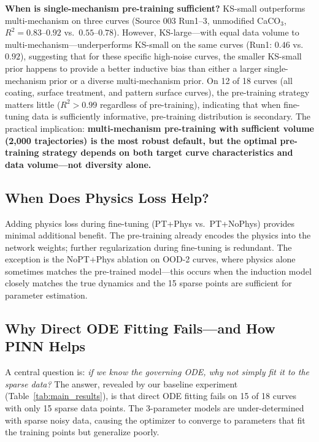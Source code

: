 \documentclass[review]{elsarticle}
\begin{document}
\textbf{When is single-mechanism pre-training sufficient?} KS-small outperforms multi-mechanism on three curves (Source 003 Run1--3, unmodified CaCO$_3$, $R^2 = 0.83$--$0.92$ vs.\ $0.55$--$0.78$). However, KS-large---with equal data volume to multi-mechanism---underperforms KS-small on the same curves (Run1: $0.46$ vs.\ $0.92$), suggesting that for these specific high-noise curves, the smaller KS-small prior happens to provide a better inductive bias than either a larger single-mechanism prior or a diverse multi-mechanism prior. On 12 of 18 curves (all coating, surface treatment, and pattern surface curves), the pre-training strategy matters little ($R^2 > 0.99$ regardless of pre-training), indicating that when fine-tuning data is sufficiently informative, pre-training distribution is secondary. The practical implication: \textbf{multi-mechanism pre-training with sufficient volume (2,000 trajectories) is the most robust default, but the optimal pre-training strategy depends on both target curve characteristics and data volume---not diversity alone.}

\subsection{When Does Physics Loss Help?}

Adding physics loss during fine-tuning (PT+Phys vs.\ PT+NoPhys) provides minimal additional benefit. The pre-training already encodes the physics into the network weights; further regularization during fine-tuning is redundant. The exception is the NoPT+Phys ablation on OOD-2 curves, where physics alone sometimes matches the pre-trained model---this occurs when the induction model closely matches the true dynamics and the 15 sparse points are sufficient for parameter estimation.

\subsection{Why Direct ODE Fitting Fails---and How PINN Helps}
\label{sec:why_ode_fails}

A central question is: \textit{if we know the governing ODE, why not simply fit it to the sparse data?} The answer, revealed by our baseline experiment (Table~\ref{tab:main_results}), is that direct ODE fitting fails on 15 of 18 curves with only 15 sparse data points. The 3-parameter models are under-determined with sparse noisy data, causing the optimizer to converge to parameters that fit the training points but generalize poorly.
\end{document}
